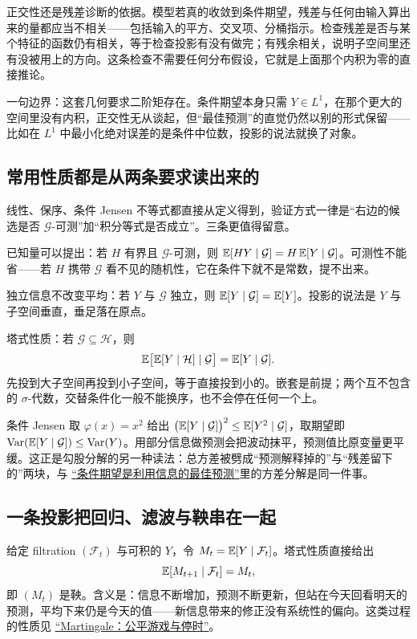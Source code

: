 正交性还是残差诊断的依据。模型若真的收敛到条件期望，残差与任何由输入算出来的量都应当不相关——包括输入的平方、交叉项、分桶指示。检查残差是否与某个特征的函数仍有相关，等于检查投影有没有做完；有残余相关，说明子空间里还有没被用上的方向。这条检查不需要任何分布假设，它就是上面那个内积为零的直接推论。

一句边界：这套几何要求二阶矩存在。条件期望本身只需 \(Y\in L^1\)，在那个更大的空间里没有内积，正交性无从谈起，但``最佳预测''的直觉仍然以别的形式保留——比如在 \(L^1\) 中最小化绝对误差的是条件中位数，投影的说法就换了对象。

\subsection{常用性质都是从两条要求读出来的}

线性、保序、条件 Jensen 不等式都直接从定义得到，验证方式一律是``右边的候选是否 \(\mathcal G\)-可测''加``积分等式是否成立''。三条更值得留意。

已知量可以提出：若 \(H\) 有界且 \(\mathcal G\)-可测，则 \(\mathbb{E}[HY\mid\mathcal G]=H\,\mathbb{E}[Y\mid\mathcal G]\)。可测性不能省——若 \(H\) 携带 \(\mathcal G\) 看不见的随机性，它在条件下就不是常数，提不出来。

独立信息不改变平均：若 \(Y\) 与 \(\mathcal G\) 独立，则 \(\mathbb{E}[Y\mid\mathcal G]=\mathbb{E}[Y]\)。投影的说法是 \(Y\) 与子空间垂直，垂足落在原点。

塔式性质：若 \(\mathcal G\subseteq\mathcal H\)，则
\[
\mathbb{E}\bigl[\mathbb{E}[Y\mid\mathcal H]\mid\mathcal G\bigr]=\mathbb{E}[Y\mid\mathcal G].
\]
先投到大子空间再投到小子空间，等于直接投到小的。嵌套是前提；两个互不包含的 \(\sigma\)-代数，交替条件化一般不能换序，也不会停在任何一个上。

条件 Jensen 取 \(\varphi(x)=x^{2}\) 给出 \(\bigl(\mathbb{E}[Y\mid\mathcal G]\bigr)^{2}\le\mathbb{E}[Y^{2}\mid\mathcal G]\)，取期望即 \(\operatorname{Var}(\mathbb{E}[Y\mid\mathcal G])\le\operatorname{Var}(Y)\)。用部分信息做预测会把波动抹平，预测值比原变量更平缓。这正是勾股分解的另一种读法：总方差被劈成``预测解释掉的''与``残差留下的''两块，与 \hyperref[sec:05-Probability/04-Expectation-and-Moments/04]{``条件期望是利用信息的最佳预测''}里的方差分解是同一件事。

\subsection{一条投影把回归、滤波与鞅串在一起}

给定 filtration \((\mathcal F_t)\) 与可积的 \(Y\)，令 \(M_t=\mathbb{E}[Y\mid\mathcal F_t]\)。塔式性质直接给出
\[
\mathbb{E}[M_{t+1}\mid\mathcal F_t]=M_t,
\]
即 \((M_t)\) 是鞅。含义是：信息不断增加，预测不断更新，但站在今天回看明天的预测，平均下来仍是今天的值——新信息带来的修正没有系统性的偏向。这类过程的性质见 \hyperref[sec:06-Random-Processes/04-Applications/02]{``Martingale：公平游戏与停时''}。

